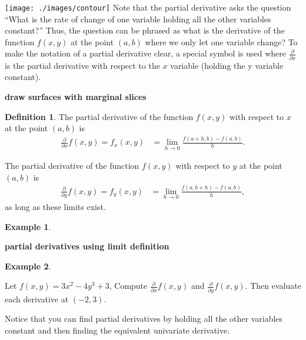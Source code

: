 \documentclass[
]{book}
\theoremstyle{definition}
\newtheorem{definition}{Definition}[chapter]
\theoremstyle{definition}
\newtheorem{example}{Example}[chapter]
\theoremstyle{definition}
\theoremstyle{remark}
\begin{document}
\texttt{[image: ./images/contour]}
Note that the partial derivative asks the question ``What is the rate of change of one variable holding all the other variables constant?'' Thus, the question can be phrased as what is the derivative of the function \(f(x, y)\) at the point \((a, b)\) where we only let one variable change? To make the notation of a partial derivative clear, a special symbol is used where \(\frac{\partial}{\partial x}\) is the partial derivative with respect to the \(x\) variable (holding the y variable constant).

\textbf{draw surfaces with marginal slices}

\begin{definition}
\protect\hypertarget{def:partial}{}{\label{def:partial} }The partial derivative of the function \(f(x, y)\) with respect to \(x\) at the point \((a, b)\) is
\[
\begin{aligned}
\frac{\partial}{\partial x} f(x, y) = f_x(x, y) & = \lim_{h \rightarrow 0} \frac{f(a + h, b) - f(a, b)} {h}.
\end{aligned}
\]

The partial derivative of the function \(f(x, y)\) with respect to \(y\) at the point \((a, b)\) is
\[
\begin{aligned}
\frac{\partial}{\partial y} f(x, y) = f_y(x, y) & = \lim_{h \rightarrow 0} \frac{f(a, b + h) - f(a, b)} {h},
\end{aligned}
\]
as long as these limits exist.
\end{definition}

\begin{example}
\protect\hypertarget{exm:unlabeled-div-214}{}\label{exm:unlabeled-div-214}

\textbf{partial derivatives using limit definition}

\end{example}

\begin{example}
\protect\hypertarget{exm:unlabeled-div-215}{}\label{exm:unlabeled-div-215}

Let \(f(x, y) = 3x^2 - 4 y^3 + 3\), Compute \(\frac{\partial}{\partial x}f(x, y)\) and \(\frac{\partial}{\partial y}f(x, y)\). Then evaluate each derivative at \((-2, 3)\).

\end{example}

Notice that you can find partial derivatives by holding all the other variables constant and then finding the equivalent univariate derivative.
\end{document}
